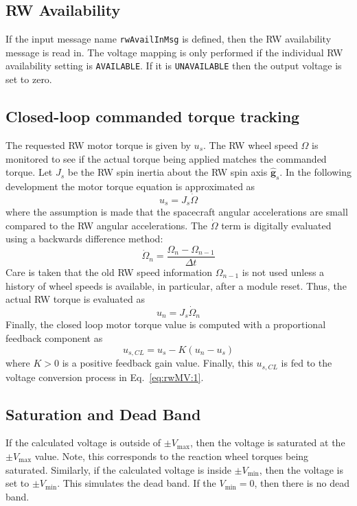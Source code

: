 \subsection{RW Availability} 
If the input message name {\tt rwAvailInMsg} is defined, then the RW availability message is read in. The voltage mapping is only performed if the individual RW availability setting is {\tt AVAILABLE}.  If it is {\tt UNAVAILABLE} then the output voltage is set to zero.


\subsection{Closed-loop commanded torque tracking}
The requested RW motor torque is given by $u_{s}$.  The RW wheel speed $\Omega$ is monitored to see if the actual torque being applied matches the commanded torque.  Let $J_{s}$ be the RW spin inertia about the RW spin axis $\hat{\bm g}_{s}$.   In the following development the motor torque equation is approximated as
\begin{equation}
u_{s} = J_{s} \dot\Omega
\end{equation}
where the assumption is made that the spacecraft angular accelerations are small compared to the RW angular accelerations.  The $\dot\Omega$ term is digitally evaluated using a backwards difference method:
\begin{equation}
\dot\Omega_{n} = \frac{\Omega_{n} - \Omega_{n-1}}{\Delta t}
\end{equation}
Care is taken that the old RW speed information $\Omega_{n-1}$ is not used unless a history of wheel speeds is available, in particular, after a module reset.  Thus, the actual RW torque is evaluated as
\begin{equation}
u_{n} = J_{s} \dot\Omega_{n}
\end{equation}
Finally, the closed loop motor torque value is computed with a proportional feedback component as
\begin{equation}
u_{s,CL} = u_{s} - K (u_{n} - u_{s})
\end{equation}
where $K>0$ is a positive feedback gain value.  Finally, this $u_{s,CL}$ is fed to the voltage conversion process in Eq.~\eqref{eq:rwMV:1}.  

\subsection{Saturation and Dead Band}
If the calculated voltage is outside of $\pm V_{\mathrm{max}}$, then the voltage is saturated at the $\pm V_{\mathrm{max}}$ value. Note, this corresponds to the reaction wheel torques being saturated. Similarly, if the calculated voltage is inside $\pm V_{\mathrm{min}}$, then the voltage is set to $\pm V_{\mathrm{min}}$. This simulates the dead band. If the $V_{\mathrm{min}} = 0$, then there is no dead band.